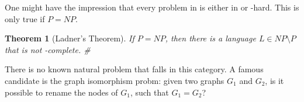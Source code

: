 \documentclass{report}
\newcommand{\NP}{\text{$\mathit{NP}$}}
\newcommand{\Po}{\text{$\mathit{P}$}}
\newtheorem{theorem}[definition]{Theorem}
\begin{document}
One might have the impression that every problem in \NP is either in \Po or \NP-hard. This is only true if $\Po=\NP$.

\begin{theorem}[Ladner's Theorem]If $\Po=\NP$, then there is a language $L\in\NP\setminus\Po$ that is not \NP-complete. \#
\end{theorem}
There is no known natural problem that falls in this category. A famous candidate is the graph isomorphism probm: given two graphs $G_1$ and $G_2$, is it possible to rename the nodes of $G_1$, such that $G_1=G_2$?
\end{document}
